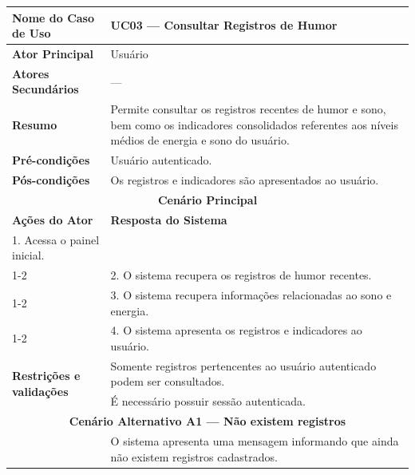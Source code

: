 
\begin{longtable}{| p{} | p{} |}
\hline

\textbf{Nome do Caso de Uso} &
UC03 --- Consultar Registros de Humor \\
\hline

\textbf{Ator Principal} &
Usuário \\
\hline

\textbf{Atores Secundários} &
--- \\
\hline

\textbf{Resumo} &

Permite consultar os registros recentes de humor e sono, bem como os
indicadores consolidados referentes aos níveis médios de energia e
sono do usuário. \\

\hline

\textbf{Pré-condições} &
Usuário autenticado. \\
\hline

\textbf{Pós-condições} &
Os registros e indicadores são apresentados ao usuário. \\
\hline

\multicolumn{2}{|c|}{\textbf{Cenário Principal}}\\
\hline

\textbf{Ações do Ator} &
\textbf{Resposta do Sistema} \\
\hline

1. Acessa o painel inicial. & \\
\cline{1-2}

& 2. O sistema recupera os registros de humor recentes. \\
\cline{1-2}

&
3. O sistema recupera informações relacionadas ao sono e energia. \\
\cline{1-2}

&
4. O sistema apresenta os registros e indicadores ao usuário. \\
\hline

\multirow{2}{.40\textwidth}{\textbf{Restrições e validações}}
&
Somente registros pertencentes ao usuário autenticado podem ser consultados. \\
\cline{2-2}

&
É necessário possuir sessão autenticada. \\
\hline

\multicolumn{2}{|c|}{\textbf{Cenário Alternativo A1 --- Não existem registros}}\\
\hline

&
O sistema apresenta uma mensagem informando que ainda não existem registros cadastrados.\\
\hline

\end{longtable}

